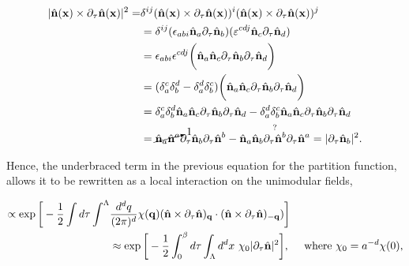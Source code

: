 \begin{equation}
    \begin{split}
        |\hat{\bf n}({\bf x}) \times \partial_{\tau} \hat{\bf n}({\bf x})|^2 =& \delta^{ij} (\hat{\bf n}({\bf x}) \times \partial_{\tau} \hat{\bf n}({\bf x}))^{i} (\hat{\bf n}({\bf x}) \times \partial_{\tau} \hat{\bf n}({\bf x}))^j \\
        &= \delta^{ij} (\epsilon_{abi} \hat{\bf n}_a \partial_{\tau} \hat{\bf n}_b) (\varepsilon^{cdj} \hat{\bf n}_c \partial_{\tau} \hat{\bf n}_d) \\
        &= \epsilon_{abi} \epsilon^{cdj} 
        \bigg(
        \hat{\bf n}_a \hat{\bf n}_c \partial_{\tau} \hat{\bf n}_b \partial_{\tau} \hat{\bf n}_d
        \bigg) \\
        &= (\delta^{c}_{a} \delta^{d}_{b} - \delta^{d}_{a} \delta^{c}_{b})\bigg(
        \hat{\bf n}_a \hat{\bf n}_c \partial_{\tau} \hat{\bf n}_b \partial_{\tau} \hat{\bf n}_d
        \bigg) \\
        &= \delta^{c}_{a} \delta^{d}_{b} \hat{\bf n}_a \hat{\bf n}_c \partial_{\tau} \hat{\bf n}_b \partial_{\tau} \hat{\bf n}_d
        - \delta^{d}_{a} \delta^{c}_{b}\hat{\bf n}_a \hat{\bf n}_c \partial_{\tau} \hat{\bf n}_b \partial_{\tau} \hat{\bf n}_d \\
        &= \cancelto{1}{\hat{\bf n}_a \hat{\bf n}^a} \partial_{\tau} \hat{\bf n}_b \partial_{\tau} \hat{\bf n}^b - \overset{?}{\hat{\bf n}_a \hat{\bf n}_b \partial_{\tau} \hat{\bf n}^b \partial_{\tau} \hat{\bf n}^a} = |\partial_{\tau} \hat{\bf n}_b|^2.
     \end{split}
\end{equation}

Hence, the underbraced term in the previous equation for the partition function, allows it to be rewritten as a local interaction on the unimodular fields, 

\begin{equation}
\begin{split}
    \propto \exp\bigg[-\frac{1}{2} \int d\tau \int^\Lambda & \frac{d^d q}{(2\pi)^d} \chi({\bf q}) (\hat{{\bf n}} \times \partial_{\tau} \hat{{\bf n}})_{{\bf q}} \cdot (\hat{{\bf n}} \times \partial_{\tau} \hat{{\bf n}})_{-{\bf q}})
    \bigg] \\
    & \approx \exp \bigg[
    -\frac{1}{2} \int_{0}^{\beta} d\tau \int_{\Lambda} d^dx \textnormal{ } \chi_0 |\partial_{\tau} \hat{{\bf n}}|^2 \bigg], \quad \textnormal{ where } \chi_0 = a^{-d} \chi(0),
\end{split}
\end{equation}

